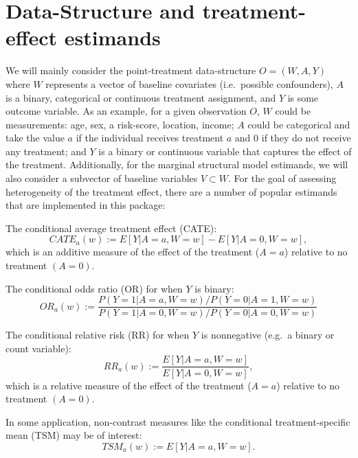 \documentclass[
]{jss}
\begin{document}
\section{Data-Structure and treatment-effect estimands}

We will mainly consider the point-treatment data-structure
\(O = (W,A,Y)\) where \(W\) represents a vector of baseline covariates
(i.e.~possible confounders), \(A\) is a binary, categorical or
continuous treatment assignment, and \(Y\) is some outcome variable. As
an example, for a given observation \(O\), \(W\) could be measurements:
age, sex, a risk-score, location, income; \(A\) could be categorical and
take the value \(a\) if the individual receives treatment \(a\) and
\(0\) if they do not receive any treatment; and \(Y\) is a binary or
continuous variable that captures the effect of the treatment.
Additionally, for the marginal structural model estimands, we will also
consider a subvector of baseline variables \(V \subset W\). For the goal
of assessing heterogeneity of the treatment effect, there are a number
of popular estimands that are implemented in this package:

\noindent The conditional average treatment effect (CATE):
\begin{equation}
CATE_{a}(w) := E[Y|A=a,W=w] - E[Y|A=0, W=w],
\end{equation} which is an additive measure of the effect of the
treatment (\(A=a\)) relative to no treatment \((A=0)\).

\vspace{0.5cm}

\noindent The conditional odds ratio (OR) for when \(Y\) is binary:
\begin{equation}
OR_a(w) := \frac{P(Y=1|A=a,W=w)/P(Y=0|A=1,W=w)}{P(Y=1|A=0,W=w)/P(Y=0|A=0,W=w)}
\end{equation}

\vspace{0.5cm}

\noindent The conditional relative risk (RR) for when \(Y\) is
nonnegative (e.g.~a binary or count variable): \begin{equation}
RR_a(w) := \frac{E[Y|A=a,W=w]}{E[Y|A=0,W=w]},
\end{equation} which is a relative measure of the effect of the
treatment (\(A=a\)) relative to no treatment \((A=0)\).

\vspace{0.5cm}

\noindent In some application, non-contrast measures like the
conditional treatment-specific mean (TSM) may be of interest:
\begin{equation}
TSM_a(w) := E[Y|A=a,W=w].
\end{equation}
\end{document}
